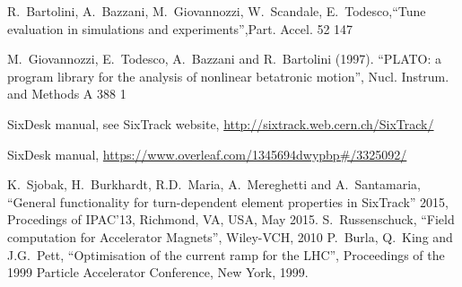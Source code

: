\documentclass[a4paper,11pt]{report}
\begin{document}
\begin{thebibliography}{99}
 R.~Bartolini, A.~Bazzani, M.~Giovannozzi, W.~Scandale, E.~Todesco,``Tune evaluation in simulations and experiments'',Part. Accel. 52 147

 M.~Giovannozzi, E.~Todesco, A.~Bazzani and R.~Bartolini (1997). ``PLATO: a program library for the analysis of nonlinear betatronic motion'', Nucl. Instrum. and Methods A 388 1

 SixDesk manual, see SixTrack website, \url{http://sixtrack.web.cern.ch/SixTrack/}

 SixDesk manual, \url{https://www.overleaf.com/1345694dwypbp#/3325092/}

%
%
 K.~Sjobak, H.~Burkhardt, R.D.~Maria, A.~Mereghetti and A.~Santamaria,
  ``General functionality for turn-dependent element properties in SixTrack''
  2015, Procedings of IPAC'13, Richmond, VA, USA, May 2015.
%
 S.~Russenschuck,
  ``Field computation for Accelerator Magnets'',
  Wiley-VCH, 2010
 P.~Burla, Q.~King and J.G.~Pett,
  ``Optimisation of the current ramp for the LHC'',
  Proceedings of the 1999 Particle Accelerator Conference, New York, 1999.
  
%

\end{thebibliography}
\end{document}
